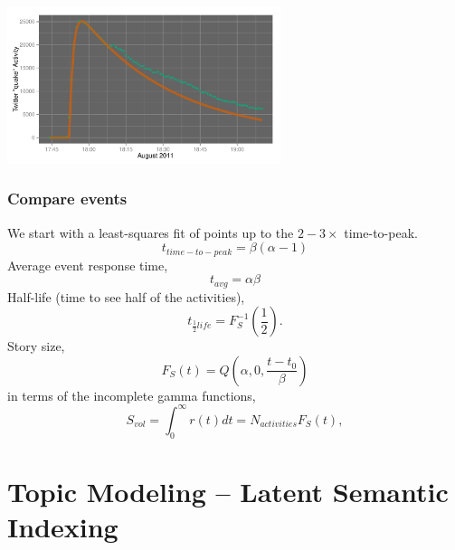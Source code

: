 \documentclass{beamer}
\begin{document}
\begin{frame}
  \begin{center}
    \includegraphics[width=8cm]{./imgs/SMP_va_quake_fit1.pdf}
  \end{center}
\end{frame}

\begin{frame}
\frametitle{Compare events} 
We start with a least-squares fit of points up to the $2-3 \times$ time-to-peak.
\begin{equation*}
t_{time-to-peak} = \beta (\alpha - 1)
\label{eq:peak}
\end{equation*}
Average event response time,
\begin{equation*}
t_{avg} = \alpha \beta
\label{eq:avg}
\end{equation*}
Half-life (time to see half of the activities),
\begin{equation*}
t_{\frac{1}{2}life} = F^{-1}_S(\frac{1}{2}).
\label{eq:half}
\end{equation*} 
Story size,
\begin{equation}
F_S(t) = Q(\alpha, 0, \frac{ t-t_0}{\beta})
\label{incgamma}
\end{equation}
in terms of the incomplete gamma functions, 
\begin{equation}
S_{vol} = \int_0^\infty r(t) dt = N_{activities} F_S(t),
\label{eq:mass}
\end{equation}
\end{frame}


\section{Topic Modeling -- Latent Semantic Indexing}
{
\begin{frame}
\textcolor{black} {
\hfill \Huge \insertsection}
\end{frame}
}
\end{document}
